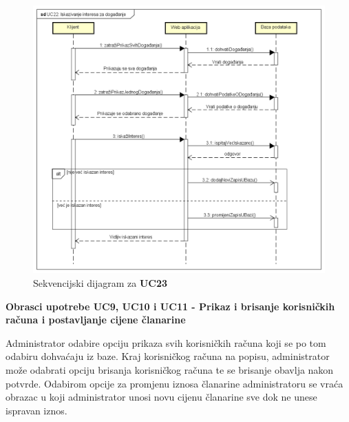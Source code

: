 				\begin{figure}[H]
					\includegraphics[width=\textwidth]{dijagrami/sd3.PNG}
					\centering
					\caption{Sekvencijski dijagram za \textbf{UC23}}
					\label{fig:promjene}
				\end{figure}
				
				\newpage
				
				\noindent \textbf{Obrasci upotrebe UC9, UC10 i UC11 - Prikaz i brisanje korisničkih računa i postavljanje cijene članarine}
				
				\noindent Administrator odabire opciju prikaza svih korisničkih računa koji se po tom odabiru dohvaćaju iz baze. Kraj korisničkog računa na popisu, administrator može odabrati opciju brisanja korisničkog računa te se brisanje obavlja nakon potvrde. Odabirom opcije za promjenu iznosa članarine administratoru se vraća obrazac u koji administrator unosi novu cijenu članarine sve dok ne unese ispravan iznos.
				
				\vspace{-0.3cm}
				
